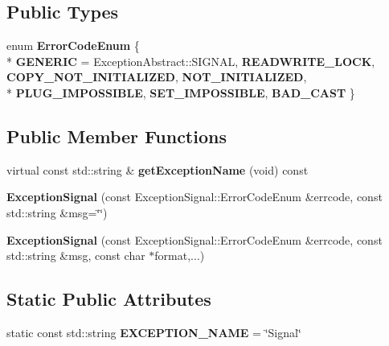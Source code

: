 \subsection*{Public Types}
\begin{DoxyCompactItemize}
\item 
enum {\bfseries Error\+Code\+Enum} \{ \\*
{\bfseries G\+E\+N\+E\+R\+IC} = Exception\+Abstract\+:\+:S\+I\+G\+N\+AL, 
{\bfseries R\+E\+A\+D\+W\+R\+I\+T\+E\+\_\+\+L\+O\+CK}, 
{\bfseries C\+O\+P\+Y\+\_\+\+N\+O\+T\+\_\+\+I\+N\+I\+T\+I\+A\+L\+I\+Z\+ED}, 
{\bfseries N\+O\+T\+\_\+\+I\+N\+I\+T\+I\+A\+L\+I\+Z\+ED}, 
\\*
{\bfseries P\+L\+U\+G\+\_\+\+I\+M\+P\+O\+S\+S\+I\+B\+LE}, 
{\bfseries S\+E\+T\+\_\+\+I\+M\+P\+O\+S\+S\+I\+B\+LE}, 
{\bfseries B\+A\+D\+\_\+\+C\+A\+ST}
 \}\hypertarget{classdynamic__graph_1_1ExceptionSignal_a122fbe147d0fd92c511f5839394e2bc1}{}\label{classdynamic__graph_1_1ExceptionSignal_a122fbe147d0fd92c511f5839394e2bc1}

\end{DoxyCompactItemize}
\subsection*{Public Member Functions}
\begin{DoxyCompactItemize}
\item 
virtual const std\+::string \& {\bfseries get\+Exception\+Name} (void) const \hypertarget{classdynamic__graph_1_1ExceptionSignal_ad9503d0b270c9a992f8f7798ef4d62d1}{}\label{classdynamic__graph_1_1ExceptionSignal_ad9503d0b270c9a992f8f7798ef4d62d1}

\item 
{\bfseries Exception\+Signal} (const Exception\+Signal\+::\+Error\+Code\+Enum \&errcode, const std\+::string \&msg=\char`\"{}\char`\"{})\hypertarget{classdynamic__graph_1_1ExceptionSignal_aad0d2b0f022ca8bfc8ce3a9e81475d52}{}\label{classdynamic__graph_1_1ExceptionSignal_aad0d2b0f022ca8bfc8ce3a9e81475d52}

\item 
{\bfseries Exception\+Signal} (const Exception\+Signal\+::\+Error\+Code\+Enum \&errcode, const std\+::string \&msg, const char $\ast$format,...)\hypertarget{classdynamic__graph_1_1ExceptionSignal_a8b317aa83e16632ce3ce6e6c833acb91}{}\label{classdynamic__graph_1_1ExceptionSignal_a8b317aa83e16632ce3ce6e6c833acb91}

\end{DoxyCompactItemize}
\subsection*{Static Public Attributes}
\begin{DoxyCompactItemize}
\item 
static const std\+::string {\bfseries E\+X\+C\+E\+P\+T\+I\+O\+N\+\_\+\+N\+A\+ME} = \char`\"{}Signal\char`\"{}\hypertarget{classdynamic__graph_1_1ExceptionSignal_a3f08eaf0b6f59dffaa47e844387e978b}{}\label{classdynamic__graph_1_1ExceptionSignal_a3f08eaf0b6f59dffaa47e844387e978b}

\end{DoxyCompactItemize}
